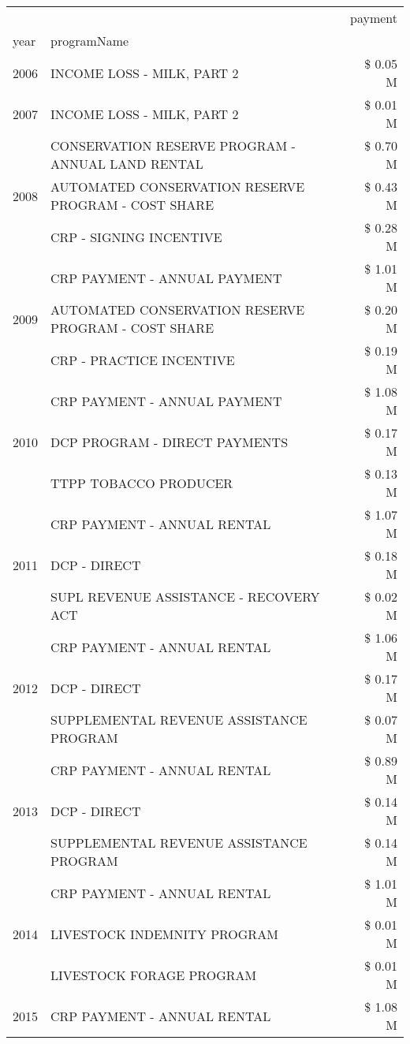 \begin{tabular}{llr}
\toprule
 &  & payment \\
year & programName &  \\
\midrule
2006 & INCOME LOSS - MILK, PART 2 & \$ 0.05 M \\
\cline{1-3}
2007 & INCOME LOSS - MILK, PART 2 & \$ 0.01 M \\
\cline{1-3}
\multirow[t]{3}{*}{2008} & CONSERVATION RESERVE PROGRAM - ANNUAL LAND RENTAL & \$ 0.70 M \\
 & AUTOMATED CONSERVATION RESERVE PROGRAM - COST SHARE & \$ 0.43 M \\
 & CRP - SIGNING INCENTIVE & \$ 0.28 M \\
\cline{1-3}
\multirow[t]{3}{*}{2009} & CRP PAYMENT - ANNUAL PAYMENT & \$ 1.01 M \\
 & AUTOMATED CONSERVATION RESERVE PROGRAM - COST SHARE & \$ 0.20 M \\
 & CRP - PRACTICE INCENTIVE & \$ 0.19 M \\
\cline{1-3}
\multirow[t]{3}{*}{2010} & CRP PAYMENT - ANNUAL PAYMENT & \$ 1.08 M \\
 & DCP PROGRAM - DIRECT PAYMENTS & \$ 0.17 M \\
 & TTPP TOBACCO PRODUCER & \$ 0.13 M \\
\cline{1-3}
\multirow[t]{3}{*}{2011} & CRP PAYMENT - ANNUAL RENTAL & \$ 1.07 M \\
 & DCP - DIRECT & \$ 0.18 M \\
 & SUPL REVENUE ASSISTANCE - RECOVERY ACT & \$ 0.02 M \\
\cline{1-3}
\multirow[t]{3}{*}{2012} & CRP PAYMENT - ANNUAL RENTAL & \$ 1.06 M \\
 & DCP - DIRECT & \$ 0.17 M \\
 & SUPPLEMENTAL REVENUE ASSISTANCE PROGRAM & \$ 0.07 M \\
\cline{1-3}
\multirow[t]{3}{*}{2013} & CRP PAYMENT - ANNUAL RENTAL & \$ 0.89 M \\
 & DCP - DIRECT & \$ 0.14 M \\
 & SUPPLEMENTAL REVENUE ASSISTANCE PROGRAM & \$ 0.14 M \\
\cline{1-3}
\multirow[t]{3}{*}{2014} & CRP PAYMENT - ANNUAL RENTAL & \$ 1.01 M \\
 & LIVESTOCK INDEMNITY PROGRAM & \$ 0.01 M \\
 & LIVESTOCK FORAGE PROGRAM & \$ 0.01 M \\
\cline{1-3}
\multirow[t]{2}{*}{2015} & CRP PAYMENT - ANNUAL RENTAL & \$ 1.08 M \\

\end{tabular}

